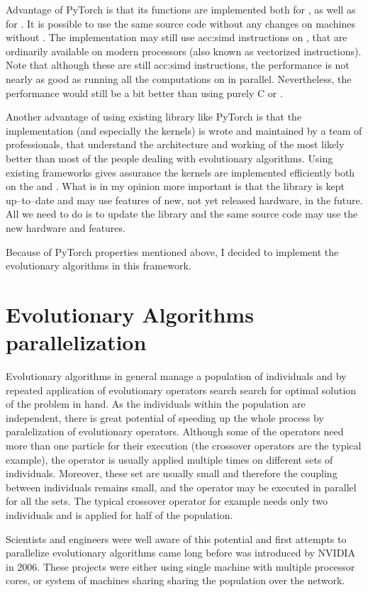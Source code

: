 Advantage of PyTorch is that its functions are implemented both for \cpuns, as well as for \gpuns. It is possible to use the same source code without any changes on machines without \gpuns. The implementation may still use \acrshort{acc:simd} instructions on \cpuns, that are ordinarily available on modern processors (also known as vectorized instructions). Note that although these are still \acrshort{acc:simd} instructions, the performance is not nearly as good as running all the computations on \gpu in parallel. Nevertheless, the performance would still be a bit better than using purely C or \cppns.

Another advantage of using existing library like PyTorch is that the implementation (and especially the \cuda kernels) is wrote and maintained by a team of professionals, that understand the architecture and working of the \gpu most likely better than most of the people dealing with evolutionary algorithms. Using existing frameworks gives assurance the kernels are implemented efficiently both on the \gpu and \cpuns. What is in my opinion more important is that the library is kept up--to--date and may use features of new, not yet released hardware, in the future. All we need to do is to update the library and the same source code may use the new hardware and features.

Because of PyTorch properties mentioned above, I decided to implement the evolutionary algorithms in this framework.




\section{Evolutionary Algorithms parallelization}

Evolutionary algorithms in general manage a population of individuals and by repeated application of evolutionary operators search search for optimal solution of the problem in hand. As the individuals within the population are independent, there is great potential of speeding up the whole process by paralelization of evolutionary operators. Although some of the operators need more than one particle for their execution (the crossover operators are the typical example), the operator is usually applied multiple times on different sets of individuals. Moreover, these set are usually small and therefore the coupling between individuals remains small, and the operator may be executed in parallel for all the sets. The typical crossover operator for example needs only two individuals and is applied for half of the population.

Scientists and engineers were well aware of this potential and first attempts to parallelize evolutionary algorithms came long before \cuda was introduced by NVIDIA \citep{PGAPack} in 2006. These projects were either using single machine with multiple processor cores, or system of machines sharing sharing the population over the network.